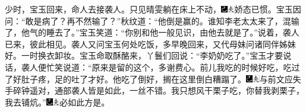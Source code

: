 少时，宝玉回来，命人去接袭人。只见晴雯躺在床上不动，{\includegraphics[width=3mm]{../Images/00003}\includegraphics[width=3mm]{../Images/00012}\footnotesize \kaishu 娇态已惯。}宝玉因问：“敢是病了？再不然输了？”秋纹道：“他倒是赢的。谁知李老太太来了，混输了，他气的睡去了。”宝玉笑道：“你别和他一般见识，由他去就是了。”说着，袭人已来，彼此相见。袭人又问宝玉何处吃饭，多早晚回来，又代母妹问诸同伴姊妹好。一时换衣卸妆。宝玉命取酥酪来，丫鬟们回说：“李奶奶吃了。”宝玉才要说话，袭人便忙笑说道：“原来是留的这个，多谢费心。前儿我吃的时候好吃，吃过了好肚子疼，足的吐了才好。他吃了倒好，搁在这里倒白糟蹋了。{\includegraphics[width=3mm]{../Images/00003}\includegraphics[width=3mm]{../Images/00012}\footnotesize \kaishu 与前文应失手碎钟遥对，通部袭人皆是如此，一丝不错。}我只想风干栗子吃，你替我剥栗子，我去铺炕。”{\includegraphics[width=3mm]{../Images/00003}\includegraphics[width=3mm]{../Images/00012}\footnotesize \kaishu 必如此方是。}

